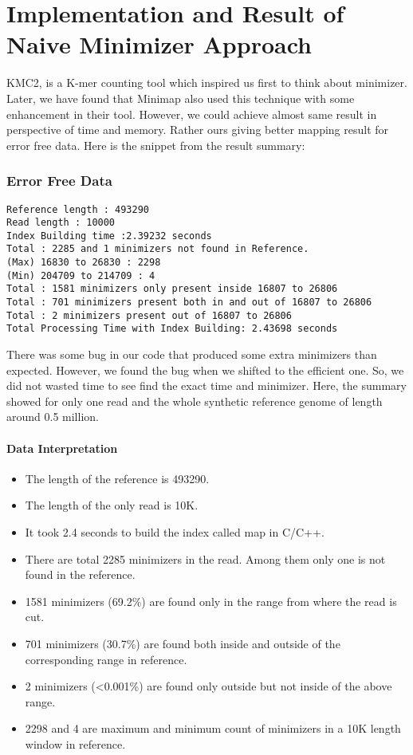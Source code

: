 \documentclass{standalone}
\begin{document}
\section{Implementation and Result of Naive Minimizer Approach}
KMC2\cite{KMC2}, is a K-mer counting tool which inspired us first to think about minimizer. Later, we have found that Minimap\cite{minimap} also used this technique with some enhancement in their tool. However, we could achieve almost same result in perspective of time and memory. Rather ours giving better mapping result for error free data. Here is the snippet from the result summary:
\subsubsection*{Error Free Data}
\begin{verbatim}
Reference length : 493290
Read length : 10000
Index Building time :2.39232 seconds
Total : 2285 and 1 minimizers not found in Reference.
(Max) 16830 to 26830 : 2298
(Min) 204709 to 214709 : 4
Total : 1581 minimizers only present inside 16807 to 26806
Total : 701 minimizers present both in and out of 16807 to 26806
Total : 2 minimizers present out of 16807 to 26806
Total Processing Time with Index Building: 2.43698 seconds
\end{verbatim}
There was some bug in our code that produced some extra minimizers than expected. However, we found the bug when we shifted to the efficient one. So, we did not wasted time to see find the exact time and minimizer. Here, the summary showed for only one read and the whole synthetic reference genome of length around 0.5 million. 

\paragraph*{Data Interpretation}
\begin{itemize}
	\item The length of the reference is 493290.
	\item The length of the only read is 10K.
	\item It took 2.4 seconds to build the index called map in C/C++.
	\item There are total 2285 minimizers in the read. Among them only one is not found in the reference.
	\item 1581 minimizers (69.2\%) are found only in the range from where the read is cut.
	\item 701 minimizers (30.7\%) are found both inside and outside of the corresponding range in reference.
	\item 2 minimizers (<0.001\%) are found only outside but not inside of the above range.
	\item 2298 and 4 are maximum and minimum count of minimizers in a 10K length window in reference. 
\end{itemize}
\end{document}
